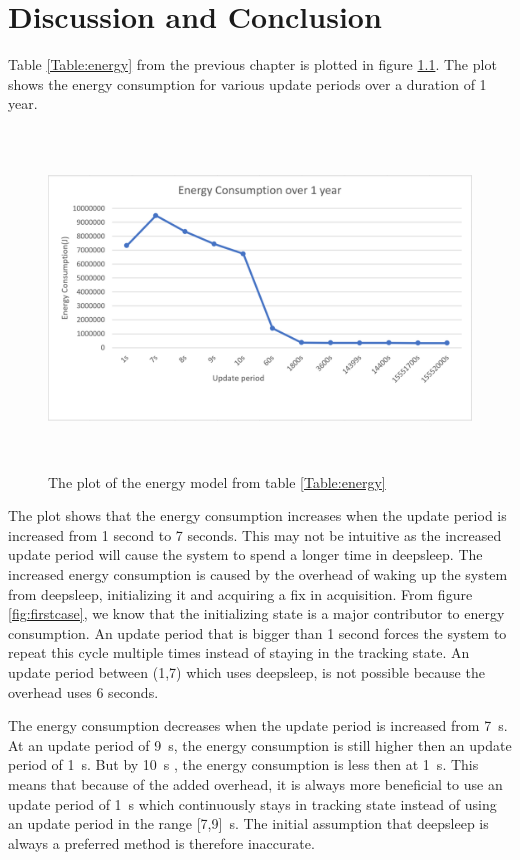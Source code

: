 \chapter{Discussion and Conclusion}
Table \ref{Table:energy} from the previous chapter is plotted in figure \ref{fig:energyconsumption}. The plot shows the energy consumption for various update periods over a duration of 1 year.

\begin{figure}[H]
\centering
\includegraphics[height=9.0cm]{Project_Report/Images/energyconsumption.PNG}
\caption{The plot of the energy model from table \ref{Table:energy}}
\label{fig:energyconsumption}
\end{figure}

The plot shows that the energy consumption increases when the update period is increased from 1 second to 7 seconds. This may not be intuitive as the increased update period will cause the system to spend a longer time in deepsleep. The increased energy consumption is caused by the overhead of waking up the system from deepsleep, initializing it and acquiring a fix in acquisition. From figure \ref{fig:firstcase}, we know that the initializing state is a major contributor to energy consumption. An update period that is bigger than  1 second forces the system to repeat this cycle multiple times instead of staying in the tracking state. An update period between (1,7) which uses deepsleep, is not possible because the overhead uses 6 seconds.

The energy consumption decreases when the update period is increased from 7 \,s. At an update period of 9 \,s, the energy consumption is still higher then an update period of 1 \,s. But by 10 \,s , the energy consumption is less then at 1 \,s. This means that because of the added overhead, it is always more beneficial to use an update period of 1 \,s which continuously stays in tracking state instead of using an update period in the range [7,9] \,s. The initial assumption that deepsleep is always a preferred method is therefore inaccurate. 

